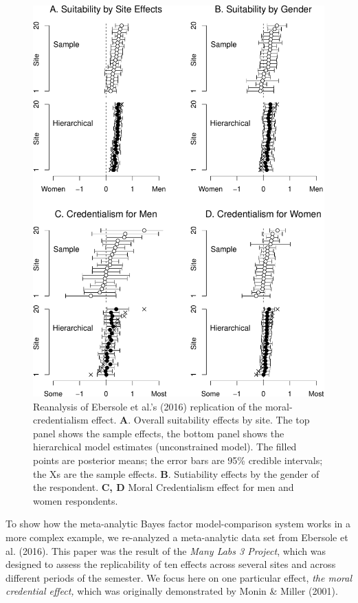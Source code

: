 \documentclass[english,man]{apa6}
\theoremstyle{definition}
\theoremstyle{definition}
\theoremstyle{remark}
\begin{document}
\begin{figure}[htbp]
\centering
\includegraphics{p_files/figure-latex/ml3Est-1.pdf}
\caption{\label{fig:ml3Est}Reanalysis of Ebersole et al.'s (2016)
replication of the moral-credentialism effect. \textbf{A}. Overall
suitability effects by site. The top panel shows the sample effects, the
bottom panel shows the hierarchical model estimates (unconstrained
model). The filled points are posterior means; the error bars are 95\%
credible intervals; the Xs are the sample effects. \textbf{B}.
Sutiability effects by the gender of the respondent. \textbf{C, D} Moral
Credentialism effect for men and women respondents.}
\end{figure}

To show how the meta-analytic Bayes factor model-comparison system works
in a more complex example, we re-analyzed a meta-analytic data set from
Ebersole et al. (2016). This paper was the result of the \emph{Many Labs
3 Project}, which was designed to assess the replicability of ten
effects across several sites and across different periods of the
semester. We focus here on one particular effect, \emph{the moral
credential effect,} which was originally demonstrated by Monin \& Miller
(2001).
\end{document}
